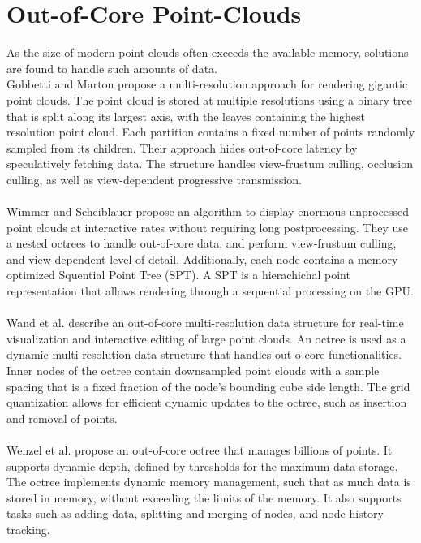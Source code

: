 \section {Out-of-Core Point-Clouds}
\label{sec:related_work_point_clouds}
As the size of modern point clouds often exceeds the available memory, solutions are found to handle such amounts of data. 
\\
Gobbetti and Marton \cite{gobbetti2004layered} propose a multi-resolution approach for rendering gigantic point clouds. The point cloud is stored at multiple resolutions using a binary tree that is split along its largest axis, with the leaves containing the highest resolution point cloud. Each partition contains a fixed number of points randomly sampled  from its children. Their approach hides out-of-core latency by speculatively fetching data. The structure handles view-frustum culling, occlusion culling, as well as view-dependent progressive transmission.
\\
\\
Wimmer and Scheiblauer \cite{wimmer2006instant} propose an algorithm to display enormous unprocessed point clouds at interactive rates without requiring long postprocessing. They use a nested octrees to handle out-of-core data, and perform view-frustum culling, and view-dependent level-of-detail. Additionally, each node contains a memory optimized Squential Point Tree (SPT). A SPT is a hierachichal point representation that allows rendering through a sequential processing on the GPU.  
\\
\\
Wand et al. \cite{wand2007interactive} describe an out-of-core multi-resolution data structure for real-time visualization and interactive editing of large point clouds. An octree is used as a dynamic multi-resolution data structure that handles out-o-core functionalities. Inner nodes of the octree contain downsampled point clouds with a sample spacing that is a fixed fraction of the node's bounding cube side length. The grid quantization allows for efficient dynamic updates to the octree, such as insertion and removal of points. 
\\
\\
Wenzel et al.  \cite{wenzel2014out} propose an out-of-core octree that manages billions of points. It supports dynamic depth, defined by thresholds for the maximum data storage. The octree implements dynamic memory management, such that as much data is stored in memory, without exceeding the limits of the memory. It also supports tasks such as adding data, splitting and merging of nodes, and node history tracking. 
